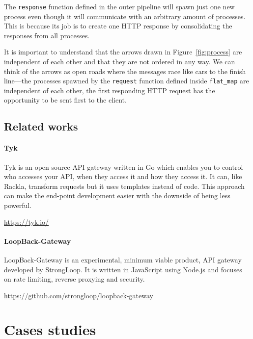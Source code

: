 \documentclass{cslthse-msc}
\begin{document}
The \lstinline{response} function defined in the outer pipeline will spawn just one new process even though it will communicate with an arbitrary amount of processes. This is because its job is to create one HTTP response by consolidating the responses from all processes.

It is important to understand that the arrows drawn in Figure~\ref{fig:process} are independent of each other and that they are not ordered in any way. We can think of the arrows as open roads where the messages race like cars to the finish line---the processes spawned by the \lstinline{request} function defined inside \lstinline{flat_map} are independent of each other, the first responding HTTP request has the opportunity to be sent first to the client.

\section{Related works}
\subsubsection{Tyk}

Tyk is an open source API gateway written in Go which enables you to control who accesses your API, when they access it and how they access it. It can, like Rackla, transform requests but it uses templates instead of code. This approach can make the end-point development easier with the downside of being less powerful.

\vspace{5mm}

\noindent \url{https://tyk.io/}

\subsubsection{LoopBack-Gateway}

LoopBack-Gateway is an experimental, minimum viable product, API gateway developed by StrongLoop. It is written in JavaScript using Node.js and focuses on rate limiting, reverse proxying and security.

\vspace{5mm}

\noindent \url{https://github.com/strongloop/loopback-gateway}

\chapter{Cases studies}
\end{document}
